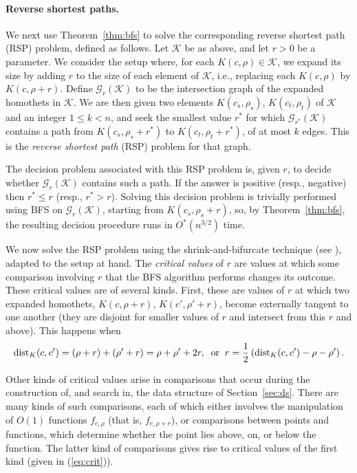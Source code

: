 \documentclass[11pt]{article}
\def\dist{{\rm dist}}
\def\G{\mathcal{G}}
\def\K{\mathcal{K}}
\theoremstyle{definition}
\begin{document}
\paragraph{Reverse shortest paths.}
We next use Theorem~\ref{thm:bfs} to solve the corresponding reverse shortest path (RSP) problem,
defined as follows.
Let $\K$ be as above, and let $r>0$ be a parameter. We consider the setup where, for each 
$K(c,\rho)\in\K$, we expand its size by adding $r$ to the size of each element of $\K$, 
i.e., replacing each $K(c,\rho)$ by $K(c,\rho+r)$.
Define $\G_r(\K)$ to
be the intersection graph of the expanded homothets in $\K$. We are then given two elements
$K(c_s,\rho_s)$, $K(c_t,\rho_t)$ of $\K$ and an integer $1\le k < n$, and seek the smallest value
$r^*$ for which $\G_{r^*}(\K)$ contains a path from $K(c_s,\rho_s+r^*)$ to $K(c_t,\rho_t+r^*)$,
of at most $k$ edges. This is the \emph{reverse shortest path} (RSP) problem for that graph.

The decision problem associated with this RSP problem is, given $r$, to decide whether $\G_r(\K)$
contains such a path. If the answer is positive (resp., negative) then $r^*\le r$ (resp.,
$r^* > r$). Solving this decision problem is trivially performed using BFS on $\G_r(\K)$, 
starting from $K(c_s,\rho_s+r)$, so, by Theorem~\ref{thm:bfs}, the resulting decision procedure
runs in $O^*(n^{3/2})$ time.

We now solve the RSP problem using the shrink-and-bifurcate technique (see \cite{BFKKS,CH,KKSS}),
adapted to the setup at hand. The \emph{critical values} of $r$ are values at which some comparison involving
$r$ that the BFS algorithm performs changes its outcome. These critical values are of several kinds. 
First, these are 
values of $r$ at which two expanded homothets, $K(c,\rho+r)$, $K(c',\rho'+r)$, become externally 
tangent to one another (they are disjoint for smaller values of $r$ and intersect from this $r$ 
and above). This happens when
\begin{equation} \label{eq:crit} 
\dist_K(c,c') = (\rho+r) + (\rho'+r) = \rho + \rho' + 2r, \;\;\text{or} \;\; 
r = \frac12 \left( \dist_K(c,c') - \rho - \rho' \right) .
\end{equation}

Other kinds of critical values arise in comparisons that occur during the construction of, and 
search in, the data structure of Section~\ref{sec:ds}. There are many kinds of such comparisons,
each of which either involves the manipulation of $O(1)$ functions $f_{c,\rho}$ (that is, 
$f_{c,\rho+r}$), or comparisons between points and functions, which determine whether the
point lies above, on, or below the function. The latter kind of comparisons gives rise to
critical values of the first kind (given in (\ref{eq:crit})). 
\end{document}
